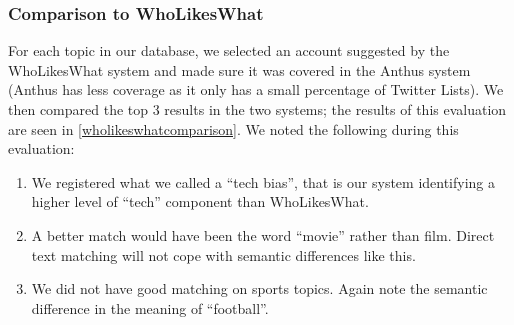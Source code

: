 \documentclass[11pt]{article}
\begin{document}
\subsubsection{Comparison to WhoLikesWhat}
For each topic in our database, we selected an account suggested by the WhoLikesWhat system \cite{wholikeswhat} and made sure it was covered in the Anthus system (Anthus has less coverage as it only has a small percentage of Twitter Lists). We then compared the top 3 results in the two systems; the results of this evaluation are seen in \cref{wholikeswhatcomparison}. We noted the following during this evaluation:

\begin{enumerate}
\item We registered what we called a ``tech bias'', that is our system identifying a higher level of ``tech'' component than WhoLikesWhat.
\item A better match would have been the word ``movie'' rather than film. Direct text matching will not cope with semantic differences like this.
\item We did not have good matching on sports topics. Again note the semantic difference in the meaning of ``football''.
\end{enumerate}
\end{document}
